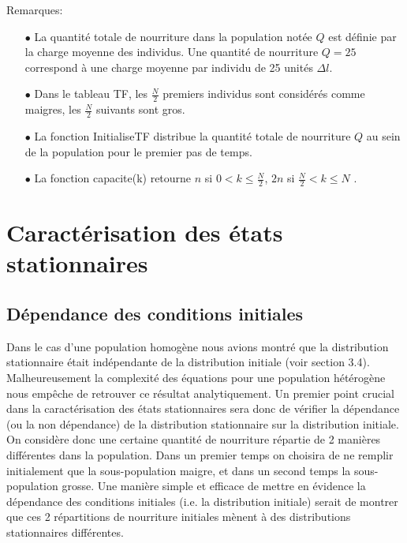 Remarques:
\begin{itemize}
\item[$\bullet$]La quantité totale de nourriture dans la population notée $Q$ est définie par la charge moyenne des individus. Une quantité de nourriture $Q=25$ correspond à une charge moyenne par individu de 25 unités $\Delta l$.
\item[$\bullet$]Dans le tableau TF, les $\frac{N}{2}$ premiers individus sont considérés comme maigres, les $\frac{N}{2}$ suivants sont gros.
\item[$\bullet$]La fonction InitialiseTF distribue la quantité totale de nourriture $Q$ au sein de la population pour le premier pas de temps.
\item[$\bullet$]La fonction capacite(k) retourne $n$ si $0<k\leq\frac{N}{2}$, $2n$ si $\frac{N}{2}< k \leq N$ .
\end{itemize}



\pagebreak

\section{Caractérisation des états stationnaires}

\subsection{Dépendance des conditions initiales}
Dans le cas d'une population homogène nous avions montré que la distribution stationnaire était indépendante de la distribution initiale (voir section 3.4). Malheureusement la complexité des équations pour une population hétérogène nous empêche de retrouver ce résultat analytiquement. Un premier point crucial dans la caractérisation des états stationnaires sera donc de vérifier la dépendance (ou la non dépendance) de la distribution stationnaire sur la distribution initiale.\\

On considère donc une certaine quantité de nourriture répartie de 2 manières différentes dans la population. Dans un premier temps on choisira de ne remplir initialement que la sous-population maigre, et dans un second temps la sous-population grosse. Une manière simple et efficace de mettre en évidence la dépendance des conditions initiales (i.e. la distribution initiale) serait de montrer que ces 2 répartitions de nourriture initiales mènent à des distributions stationnaires différentes. \\

